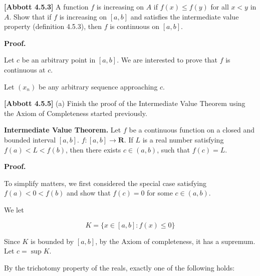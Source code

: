 \documentclass[10pt]{article}
\begin{document}
\textbf{[Abbott 4.5.3]} A function $\displaystyle f$ is increasing on $\displaystyle A$ if $\displaystyle f( x) \leq f( y)$ for all $\displaystyle x< y$ in $\displaystyle A$. Show that if $\displaystyle f$ is increasing on $\displaystyle [ a,b]$ and satisfies the intermediate value property (definition 4.5.3), then $\displaystyle f$ is continuous on $\displaystyle [ a,b]$.



\textbf{Proof. }



Let $\displaystyle c$ be an arbitrary point in $\displaystyle [ a,b]$. We are interested to prove that $\displaystyle f$ is continuous at $\displaystyle c$. 



Let $\displaystyle ( x_{n})$ be any arbitrary sequence approaching $\displaystyle c$. 







\textbf{[Abbott 4.5.5]} (a) Finish the proof of the Intermediate Value Theorem using the Axiom of Completeness started previously.



\textbf{Intermediate Value Theorem. }Let $\displaystyle f$ be a continuous function on a closed and bounded interval $\displaystyle [ a,b]$. $\displaystyle f:[ a,b]\rightarrow \mathbf{R}$. If $\displaystyle L$ is a real number satisfying $\displaystyle f( a) < L< f( b)$, then there exists $\displaystyle c\in ( a,b)$, such that $\displaystyle f( c) =L$.



\textbf{Proof.}

To simplify matters, we first considered the special case satisfying $\displaystyle f( a) < 0< f( b)$ and show that $\displaystyle f( c) =0$ for some $\displaystyle c\in ( a,b)$. 





We let 


\begin{equation*}
K=\{x\in [ a,b] :f( x) \leq 0\}
\end{equation*}


Since $\displaystyle K$ is bounded by $\displaystyle [ a,b]$, by the Axiom of completeness, it has a supremum. Let $\displaystyle c=\sup K$. 



By the trichotomy property of the reals, exactly one of the following holds:
\end{document}
